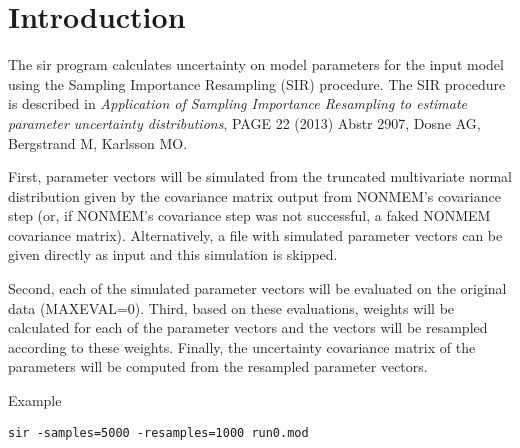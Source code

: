 


\maketitle


\section{Introduction}
The sir program calculates uncertainty
on model parameters for the input model using the Sampling Importance Resampling (SIR) procedure.
The SIR procedure is described in
\emph{Application of Sampling Importance Resampling to estimate parameter uncertainty distributions}, 
PAGE 22 (2013) Abstr 2907, Dosne AG, Bergstrand M, Karlsson MO. 

First, parameter vectors will be simulated from the truncated multivariate normal distribution 
given by the covariance matrix output from NONMEM's covariance step
(or, if NONMEM's covariance step was not successful, a faked NONMEM covariance matrix).
Alternatively, a file with simulated parameter vectors can be given directly as input and this simulation is skipped.

Second, each of the simulated parameter vectors will be evaluated on the original data (MAXEVAL=0).
Third, based on these evaluations, weights will be calculated for each of the parameter vectors and the vectors 
will be resampled according to these weights. Finally, the uncertainty covariance matrix of the parameters 
will be computed from the resampled parameter vectors.

Example
\begin{verbatim}
sir -samples=5000 -resamples=1000 run0.mod
\end{verbatim}

